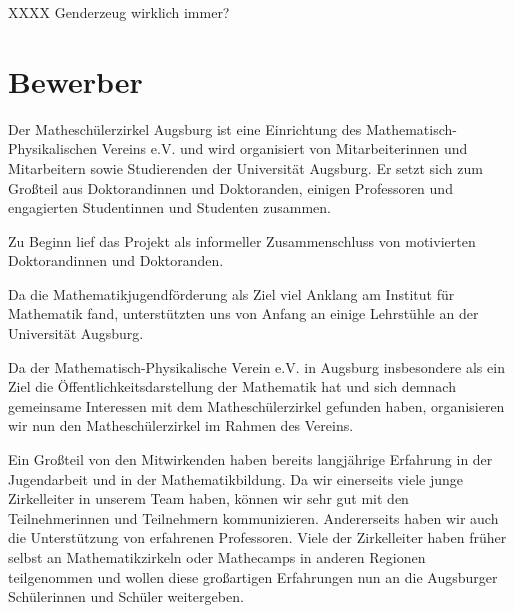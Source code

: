 \documentclass[12pt]{zettel}
\begin{document}
XXXX Genderzeug wirklich immer?

\section{Bewerber}

Der Matheschülerzirkel Augsburg ist eine Einrichtung des
Mathematisch-Physikalischen Vereins e.V. und wird organisiert von
Mitarbeiterinnen und Mitarbeitern sowie Studierenden der Universität
Augsburg. Er setzt sich zum Großteil aus Doktorandinnen und Doktoranden,
einigen Professoren und engagierten Studentinnen und Studenten zusammen.

Zu Beginn lief das Projekt als informeller Zusammenschluss von motivierten
Doktorandinnen und Doktoranden.

Da die Mathematikjugendförderung als Ziel viel Anklang am
Institut für Mathematik fand, unterstützten uns von Anfang an einige
Lehrstühle an der Universität Augsburg.

Da der Mathematisch-Physikalische Verein e.V. in Augsburg insbesondere
als ein Ziel die Öffentlichkeitsdarstellung der Mathematik hat und
sich demnach gemeinsame Interessen mit dem Matheschülerzirkel gefunden
haben, organisieren wir nun den Matheschülerzirkel im Rahmen des Vereins.

Ein Großteil von den Mitwirkenden haben bereits langjährige Erfahrung in
der Jugendarbeit und in der Mathematikbildung. Da wir
einerseits viele junge Zirkelleiter in unserem Team haben, können wir
sehr gut mit den Teilnehmerinnen und Teilnehmern kommunizieren.
Andererseits haben wir auch die Unterstützung von erfahrenen Professoren. Viele der Zirkelleiter haben früher selbst an
Mathematikzirkeln oder Mathecamps in anderen Regionen teilgenommen und wollen diese großartigen Erfahrungen nun an
die Augsburger Schülerinnen und Schüler weitergeben.
\end{document}
